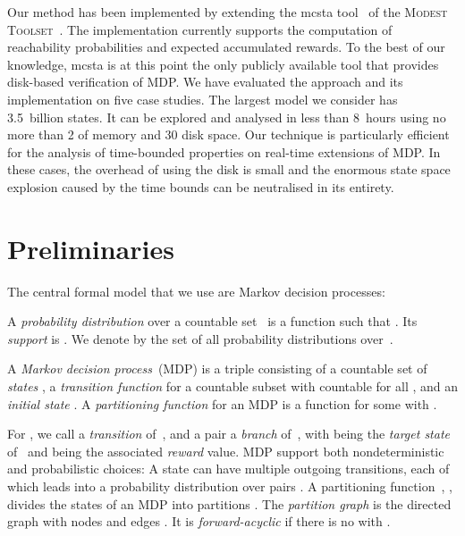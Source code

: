 \documentclass{llncs}
\newcommand{\mcsta}{\textsf{\mbox{mcsta}}\xspace}
\newcommand{\toolset}{\textsc{\mbox{Modest} Toolset}\xspace}
\newcommand{\sunit}[1]{\text{\begin{scriptsize}\,#1\end{scriptsize}}}
\begin{document}
Our method has been implemented by extending the \mcsta tool~\cite{HHH14} of the \toolset~\cite{HH14}.
The implementation currently supports the computation of reachability probabilities and expected accumulated rewards.
To the best of our knowledge, \mcsta is at this point the only publicly available tool that provides disk-based verification of MDP.
We have evaluated the approach and its implementation on five case studies.
The largest model we consider has 3.5~billion states.
It can be explored and analysed in less than 8~hours using no more than 2\sunit{GB} of memory and 30\sunit{GB} disk space.
Our technique is particularly efficient for the analysis of time-bounded properties on real-time extensions of MDP.
In these cases, the overhead of using the disk is small and the enormous state space explosion caused by the time bounds can be neutralised in its entirety.




\section{Preliminaries}
\label{sec:Preliminaries}

The central formal model that we use are Markov decision processes:

\begin{definition}
A \emph{probability distribution} over a countable set~ is a function  such that .
Its \emph{support} is .
We denote by  the set of all probability distributions over~.
\end{definition}

\begin{definition}
A \emph{Markov decision process}~(MDP) is a triple  consisting of a countable set of \emph{states} , a \emph{transition function}  for a countable subset  with  countable for all , and an \emph{initial state} .
A \emph{partitioning function} for an MDP is a function  for some  with .
\end{definition}
For , we call  a \emph{transition} of~, and a pair  a \emph{branch} of~, with  being the \emph{target state} of~ and  being the associated \emph{reward} value.
MDP support both nondeterministic and probabilistic choices:
A state can have multiple outgoing transitions, each of which leads into a probability distribution over pairs .
A partitioning function~, , divides the states of an MDP into partitions .
The \emph{partition graph} is the directed graph  with nodes  and edges .
It is \emph{forward-acyclic} if there is no  with .
\end{document}
